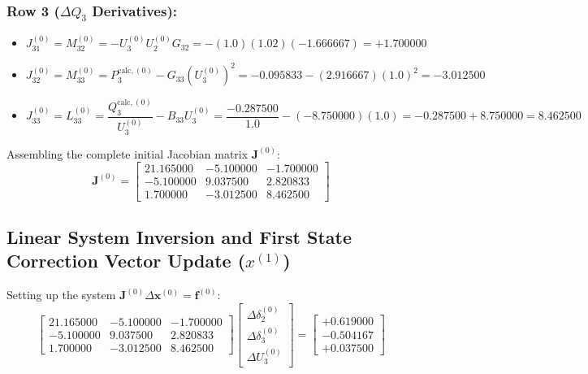 \documentclass[12pt,a4paper,oneside]{report}
\begin{document}
\subsubsection{Row 3 ($\Delta Q_3$ Derivatives):}
\begin{itemize}
    \item $J_{31}^{(0)} = M_{32}^{(0)} = -U_3^{(0)} U_2^{(0)} G_{32} = -(1.0)(1.02)(-1.666667) = +1.700000$
    \item $J_{32}^{(0)} = M_{33}^{(0)} = P_3^{\text{calc},(0)} - G_{33} (U_3^{(0)})^2 = -0.095833 - (2.916667)(1.0)^2 = -3.012500$
    \item $J_{33}^{(0)} = L_{33}^{(0)} = \dfrac{Q_3^{\text{calc},(0)}}{U_3^{(0)}} - B_{33} U_3^{(0)} = \dfrac{-0.287500}{1.0} - (-8.750000)(1.0) = -0.287500 + 8.750000 = 8.462500$
\end{itemize}

Assembling the complete initial Jacobian matrix $\mathbf{J}^{(0)}$:
\begin{equation}
\mathbf{J}^{(0)} = \begin{bmatrix}
21.165000 & -5.100000 & -1.700000 \\
-5.100000 & 9.037500 & 2.820833 \\
1.700000 & -3.012500 & 8.462500
\end{bmatrix}
\end{equation}

\subsection{Linear System Inversion and First State Correction Vector Update ($x^{(1)}$)}
Setting up the system $\mathbf{J}^{(0)} \Delta \mathbf{x}^{(0)} = \mathbf{f}^{(0)}$:
\begin{equation}
\begin{bmatrix}
21.165000 & -5.100000 & -1.700000 \\
-5.100000 & 9.037500 & 2.820833 \\
1.700000 & -3.012500 & 8.462500
\end{bmatrix}
\begin{bmatrix}
\Delta \delta_2^{(0)} \\
\Delta \delta_3^{(0)} \\
\Delta U_3^{(0)}
\end{bmatrix}
=
\begin{bmatrix}
+0.619000 \\
-0.504167 \\
+0.037500
\end{bmatrix}
\end{equation}
\end{document}
